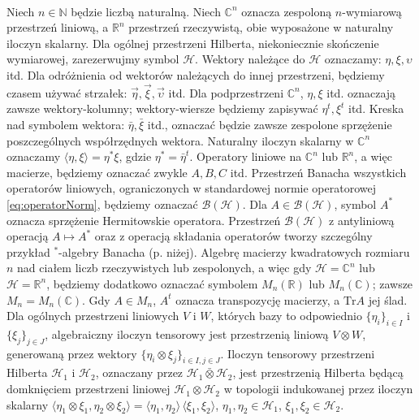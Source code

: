 \paragraph{}
Niech $n \in \mathbb{N}$ będzie liczbą naturalną.
Niech $\mathbb{C}^{n}$ oznacza zespoloną $n$-wymiarową przestrzeń liniową,
a $\mathbb{R}^{n}$ przestrzeń rzeczywistą,
obie wyposażone w naturalny iloczyn skalarny.
Dla ogólnej przestrzeni Hilberta,
niekoniecznie skończenie wymiarowej,
zarezerwujmy symbol $\mathcal{H}$.
Wektory należące do $\mathcal{H}$ oznaczamy:
$\eta, \xi, \upsilon$ itd.
Dla odróżnienia od wektorów należących do innej przestrzeni,
będziemy czasem używać strzałek: $\vec{\eta}, \vec{\xi}, \vec{\upsilon}$ itd.
Dla podprzestrzeni $\mathbb{C}^{n}$,
$\eta, \xi$ itd. oznaczają zawsze wektory-kolumny;
wektory-wiersze będziemy zapisywać
$\eta^{t}, \xi^{t}$ itd.
Kreska nad symbolem wektora: $\bar{\eta}, \bar{\xi}$ itd.,
oznaczać będzie zawsze zespolone sprzężenie poszczególnych współrzędnych wektora.
Naturalny iloczyn skalarny w $\mathbb{C}^{n}$ oznaczamy
$\langle \eta , \xi \rangle = \eta^{*} \xi$,
gdzie $\eta^{*} = \bar{\eta}^{t}$.
Operatory liniowe na $\mathbb{C}^{n}$ lub $\mathbb{R}^{n}$,
a więc macierze,
będziemy oznaczać zwykle $A, B, C$ itd.
Przestrzeń Banacha wszystkich operatorów liniowych,
ograniczonych w standardowej normie operatorowej
\eqref{eq:operatorNorm},
będziemy oznaczać $\mathcal{B}(\mathcal{H})$.
Dla $A \in \mathcal{B}(\mathcal{H})$,
symbol $A^{*}$ oznacza sprzężenie Hermitowskie operatora.
Przestrzeń $\mathcal{B}(\mathcal{H})$ z antyliniową operacją
$A \mapsto A^{*}$ oraz z operacją składania operatorów
tworzy szczególny przykład \mbox{$^{*}$-algebry} Banacha (p. niżej).
Algebrę macierzy kwadratowych rozmiaru $n$ nad ciałem liczb
rzeczywistych lub zespolonych,
a więc gdy $\mathcal{H} = \mathbb{C}^{n}$ lub
$\mathcal{H} = \mathbb{R}^{n}$,
będziemy dodatkowo oznaczać symbolem $M_{n}(\mathbb{R})$ lub
$M_{n}(\mathbb{C})$;
zawsze $M_{n} = M_{n}(\mathbb{C})$.
Gdy $A \in M_{n}$,
$A^{t}$ oznacza transpozycję macierzy,
a $\text{Tr} A$ jej ślad.
Dla ogólnych przestrzeni liniowych $V$ i $W$,
których bazy to odpowiednio
$\{ \eta_{i} \}_{i \in I}$ i
$\{ \xi_{j} \}_{j \in J}$,
algebraiczny iloczyn tensorowy
jest przestrzenią liniową $V \! \otimes \! W$, generowaną przez wektory
$\{\eta_{i} \otimes \xi_{j}\}_{i\in I, j \in J}$.
Iloczyn tensorowy przestrzeni Hilberta $\mathcal{H}_{1}$ i $\mathcal{H}_{2}$,
oznaczany przez $\mathcal{H}_{1} \bar{\otimes} \mathcal{H}_{2}$,
jest przestrzenią Hilberta będącą domknięciem przestrzeni liniowej
$\mathcal{H}_{1} \! \otimes \! \mathcal{H}_{2}$ w topologii indukowanej
przez iloczyn skalarny
$\langle \eta_{1} \otimes \xi_{1}, \eta_{2} \otimes \xi_{2} \rangle =
\langle \eta_{1} , \eta_{2} \rangle \, \langle \xi_{1}, \xi_{2} \rangle$,
$\eta_{1}, \eta_{2} \in \mathcal{H}_{1}$,
$\xi_{1}, \xi_{2} \in \mathcal{H}_{2}$.


